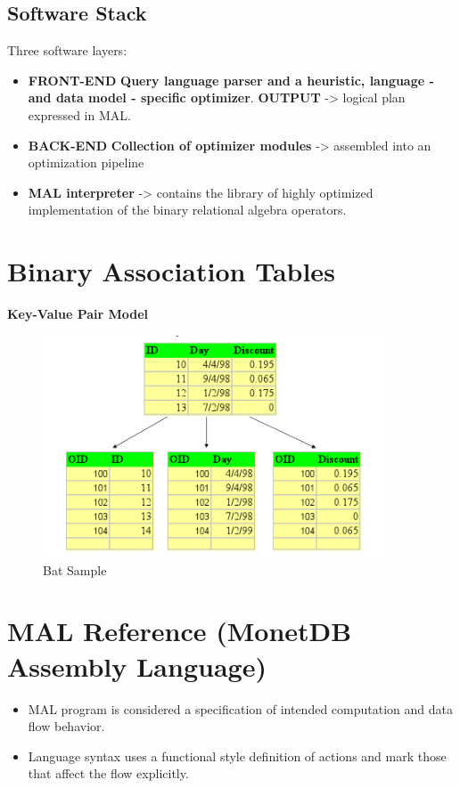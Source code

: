 \documentclass[11pt]{article}
\begin{document}
\subsection{Software Stack}
\label{sec:org3cc39d9}
Three software layers:
\begin{itemize}
\item \textbf{FRONT-END} \textbf{Query language parser and a heuristic, language - and data model - specific optimizer}. \textbf{OUTPUT} -> logical plan expressed in MAL.
\item \textbf{BACK-END} \textbf{Collection of optimizer modules} -> assembled into an optimization pipeline
\item \textbf{MAL interpreter} -> contains the library of highly optimized implementation of the binary relational algebra operators.
\end{itemize}


\section{Binary Association Tables}
\label{sec:orgc769f25}

\textbf{Key-Value Pair Model}

\begin{figure}[htbp]
\centering
\includegraphics[width=4.0in]{./Pictures/BAT.png}
\caption{\label{fig:org86beea6}
Bat Sample}
\end{figure}

\section{MAL Reference (MonetDB Assembly Language)}
\label{sec:org30106bd}

\begin{itemize}
\item MAL program is considered a specification of intended computation and data flow behavior.
\item Language syntax uses a functional style definition of actions and mark those that affect the flow explicitly.
\end{itemize}
\end{document}
